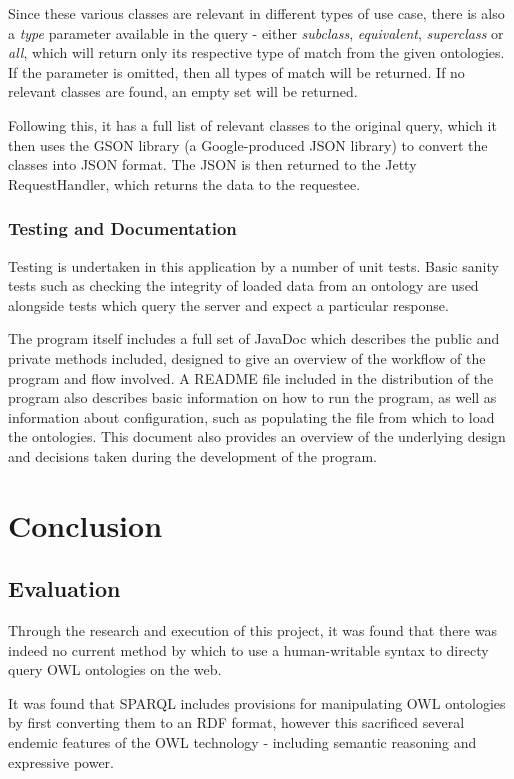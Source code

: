 \documentclass{article}
\begin{document}
Since these various classes are relevant in different types of use case, there
is also a \emph{type} parameter available in the query - either \emph{subclass},
\emph{equivalent}, \emph{superclass} or \emph{all}, which will return only its
respective type of match from the given ontologies. If the parameter is omitted,
then all types of match will be returned. If no relevant classes are found, an
empty set will be returned.

Following this, it has a full list of relevant classes to the original query,
which it then uses the GSON library\cite{gson} (a Google-produced JSON library) to convert 
the classes into JSON format. The JSON is then returned to the Jetty
RequestHandler, which returns the data to the requestee.

\subsubsection{Testing and Documentation}

Testing is undertaken in this application by a number of unit tests. Basic
sanity tests such as checking the integrity of loaded data from an ontology are
used alongside tests which query the server and expect a particular response.

The program itself includes a full set of JavaDoc which describes the public and
private methods included, designed to give an overview of the workflow of the
program and flow involved. A README file included in the distribution of the
program also describes basic information on how to run the program, as well as
information about configuration, such as populating the file from which to load
the ontologies. This document also provides an overview of the underlying design
and decisions taken during the development of the program. 

\section{Conclusion}

\subsection{Evaluation}

Through the research and execution of this project, it was found that there was
indeed no current method by which to use a human-writable syntax to directy query OWL
ontologies on the web. 

It was found that SPARQL includes provisions for manipulating OWL ontologies by
first converting them to an RDF format, however this sacrificed several endemic
features of the OWL technology - including semantic reasoning and expressive
power.
\end{document}
